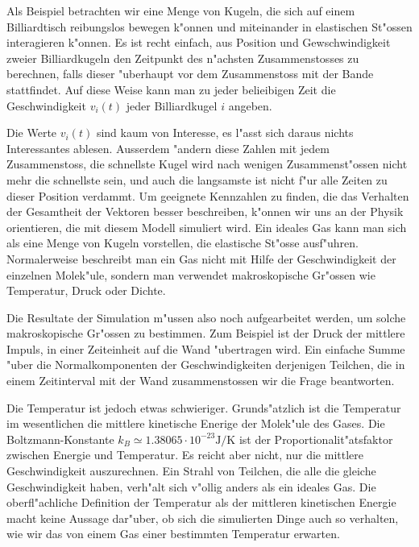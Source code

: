 \begin{beispiel}
Als Beispiel betrachten wir eine Menge von Kugeln, die sich auf einem
Billiardtisch reibungslos bewegen k"onnen und miteinander in elastischen
St"ossen interagieren k"onnen. Es ist recht einfach, aus Position und
Gewschwindigkeit zweier
Billiardkugeln den Zeitpunkt des n"achsten Zusammenstosses zu berechnen,
falls dieser "uberhaupt vor dem Zusammenstoss mit der Bande stattfindet.
Auf diese Weise kann man zu jeder belieibigen Zeit die Geschwindigkeit
$v_i(t)$ jeder Billiardkugel $i$ angeben.

Die Werte $v_i(t)$ sind kaum von Interesse, es l"asst sich daraus nichts
Interessantes ablesen.
Ausserdem "andern diese Zahlen mit jedem Zusammenstoss, die schnellste
Kugel wird nach wenigen Zusammenst"ossen nicht mehr die schnellste sein,
und auch die langsamste ist nicht f"ur alle Zeiten zu dieser Position
verdammt.
Um geeignete Kennzahlen zu finden, die das Verhalten der Gesamtheit
der Vektoren besser beschreiben, k"onnen wir uns an der Physik orientieren,
die mit diesem Modell simuliert wird.
Ein ideales Gas kann man sich als eine Menge von Kugeln vorstellen,
die elastische St"osse ausf"uhren.
Normalerweise beschreibt man ein Gas nicht mit Hilfe der Geschwindigkeit
der einzelnen Molek"ule, sondern man verwendet makroskopische Gr"ossen
wie Temperatur, Druck oder Dichte.

Die Resultate der Simulation m"ussen also noch aufgearbeitet werden, um
solche makroskopische Gr"ossen zu bestimmen.
Zum Beispiel ist der Druck der mittlere Impuls, in einer Zeiteinheit
auf die Wand "ubertragen wird.
Ein einfache Summe "uber die Normalkomponenten der Geschwindigkeiten
derjenigen Teilchen, die in einem Zeitinterval mit der Wand zusammenstossen
wir die Frage beantworten.

Die Temperatur ist jedoch etwas schwieriger.
Grunds"atzlich ist die Temperatur im wesentlichen die mittlere 
kinetische Enerige der Molek"ule des Gases. Die Boltzmann-Konstante
$k_B\simeq 1.38065\cdot10^{-23} \text{J/K}$ ist der Proportionalit"atsfaktor
zwischen Energie und Temperatur.
Es reicht aber nicht,
nur die mittlere Geschwindigkeit auszurechnen.
Ein Strahl von Teilchen, die alle die gleiche Geschwindigkeit haben,
verh"alt sich v"ollig anders als ein ideales Gas.
Die oberfl"achliche Definition der Temperatur als der mittleren
kinetischen Energie macht keine Aussage dar"uber, ob sich die
simulierten Dinge auch so verhalten, wie wir das von einem
Gas einer bestimmten Temperatur erwarten.


\end{beispiel}
